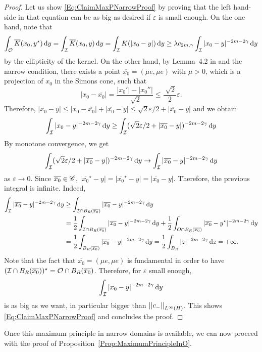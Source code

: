 \begin{proof}
	Let us show \eqref{Eq:ClaimMaxPNarrowProof} by proving that the left hand-side in that equation can be as big as desired if $\varepsilon$ is small enough. On the one hand, note that
	$$
	\int_{\mathcal{O}} \overline{K}(x_0,y^\star)\,\mathrm{d} y = \int_{\mathcal{I}} \overline{K}(x_0,y)\,\mathrm{d} y = \int_{\mathcal{I}} K(|x_0-y|)\,\mathrm{d} y \geq \lambda c_{2m,\gamma}\int_{\mathcal{I}} |x_0-y|^{-2m-2\gamma}\,\mathrm{d} y 
	$$
	by the ellipticity of the kernel. On the other hand, by Lemma~4.2 in \cite{CabreTerraI} and the narrow condition, there exists a point $\overline{x_0}=(\mu e, \mu e)$ with $\mu>0$, which is a projection of $x_0$ in the Simons cone, such that
    $$ |x_0-\overline{x_0}| = \frac{|x_0'|-|x_0''|}{\sqrt[]{2}} \leq \frac{\sqrt[]{2}}{2} \varepsilon. $$
	Therefore, $	|x_0 - y| \leq |x_0 - \overline{x_0}| + |\overline{x_0} - y| \leq \sqrt{2}\varepsilon/2 + |\overline{x_0} - y|$ and we obtain
	$$
	\int_{\mathcal{I}} |x_0-y|^{-2m-2\gamma}\,\mathrm{d} y  \geq
	\int_{\mathcal{I}} (\sqrt{2}\varepsilon/2 + |\overline{x_0} - y| )^{-2m-2\gamma}\,\mathrm{d} y
	$$
	By monotone convergence, we get
	$$
	\int_{\mathcal{I}} (\sqrt{2}\varepsilon/2 + |\overline{x_0} - y| )^{-2m-2\gamma}\,\mathrm{d} y \to \int_{\mathcal{I}} |\overline{x_0} - y|^{-2m-2\gamma} \,\mathrm{d} y 
	$$
	as $\varepsilon \to 0$. 
	Since $\overline{x_0} \in \mathscr{C}$, $|\overline{x_0}^\star - y|= |\overline{x_0}^\star - y|= |\overline{x_0} - y|$. Therefore, the previous integral is infinite. Indeed,
    \begin{align*}
    \int_{\mathcal{I}} |\overline{x_0} - y|^{-2m-2\gamma} \,\mathrm{d} y &\geq \int_{\mathcal{I}\cap B_R(\overline{x_0})} |\overline{x_0} - y|^{-2m-2\gamma}\,\mathrm{d} y \\
    &= \frac{1}{2}\int_{\mathcal{I}\cap B_R(\overline{x_0})}  |\overline{x_0} - y|^{-2m-2\gamma} \,\mathrm{d} y + \frac{1}{2}\int_{\mathcal{O}\cap B_R(\overline{x_0})} |\overline{x_0} - y^\star|^{-2m-2\gamma}\,\mathrm{d} y\\
    &= \frac{1}{2}\int_{B_R(\overline{x_0})} |\overline{x_0} - y|^{-2m-2\gamma} \,\mathrm{d} y = \frac{1}{2}\int_{B_R} |z|^{-2m-2\gamma} \,\mathrm{d} z = +\infty.
    \end{align*}
    Note that the fact that $\overline{x_0} = (\mu e, \mu e)$ is fundamental in order to have $(\mathcal{I}\cap B_R(\overline{x_0}))^\star = \mathcal{O}\cap B_R(\overline{x_0})$. Therefore, for $\varepsilon$ small enough,
	$$
	\int_{\mathcal{I}} |x_0-y|^{-2m-2\gamma}\,\mathrm{d} y 
	$$
	is as big as we want, in particular bigger than $\left | \left |{c_-} \right | \right |_{L^\infty(H)}$. This shows \eqref{Eq:ClaimMaxPNarrowProof} and concludes the proof.
\end{proof}

Once this maximum principle in narrow domains is available, we can now proceed with the proof of Proposition~\ref{Prop:MaximumPrincipleInO}.


